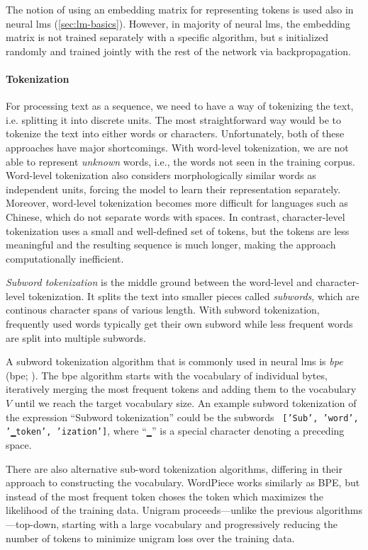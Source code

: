 {The notion of using an embedding matrix for representing tokens is used also in neural \acp{lm} (\autoref{sec:lm-basics}). However, in majority of neural \acp{lm}, the embedding matrix is not trained separately with a specific algorithm, but s initialized randomly and trained jointly with the rest of the network via backpropagation.

\paragraph{Tokenization} For processing text as a sequence, we need to have a way of tokenizing the text, i.e. splitting it into discrete units. The most straightforward way would be to tokenize the text into either words or characters. Unfortunately, both of these approaches have major shortcomings. With word-level tokenization, we are not able to represent \emph{unknown} words, i.e., the words not seen in the training corpus. Word-level tokenization also considers morphologically similar words as independent units, forcing the model to learn their representation separately. Moreover, word-level tokenization becomes more difficult for languages such as Chinese, which do not separate words with spaces. In contrast, character-level tokenization uses a small and well-defined set of tokens, but the tokens are less meaningful and the resulting sequence is much longer, making the approach computationally inefficient. \cite[p.19]{jurafsky2024}

\emph{Subword tokenization}  is the middle ground between the word-level and character-level tokenization. It splits the text into smaller pieces called \emph{subwords}, which are continous character spans of various length. With subword tokenization, frequently used words typically get their own subword while less frequent words are split into multiple subwords. \cite[p.21]{jurafsky2024}

A subword tokenization algorithm that is commonly used in neural \acp{lm} is \emph{\acl{bpe}} (\acs{bpe}; \citealp{sennrich2016neural}). The \ac{bpe} algorithm starts with the vocabulary of individual bytes, iteratively merging the most frequent tokens and adding them to the vocabulary $V$ until we reach the target vocabulary size. An example subword tokenization of the expression ``Subword tokenization'' could be the subwords \texttt{ ['Sub', 'word', '▁token', 'ization']}, where ``\texttt{▁}'' is a special character denoting a preceding space.

There are also alternative sub-word tokenization algorithms, differing in their approach to constructing the vocabulary. WordPiece \cite{wu2016google} works similarly as BPE, but instead of the most frequent token choses the token which maximizes the likelihood of the training data. Unigram \cite{kudo2018subword} proceeds---unlike the previous algorithms---top-down, starting with a large vocabulary and progressively reducing the number of tokens to minimize unigram loss over the training data.


}
